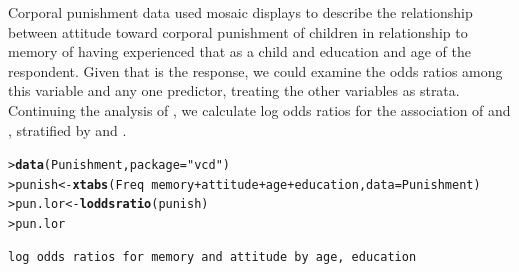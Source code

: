 \documentclass[10pt,krantz2]{krantz}\usepackage[]{graphicx}\usepackage[]{color}
\makeatletter
\newcommand{\hlstr}[1]{\textcolor[rgb]{0.192,0.494,0.8}{#1}}%
\newcommand{\hlopt}[1]{\textcolor[rgb]{0,0,0}{#1}}%
\newcommand{\hlstd}[1]{\textcolor[rgb]{0.345,0.345,0.345}{#1}}%
\newcommand{\hlkwb}[1]{\textcolor[rgb]{0.69,0.353,0.396}{#1}}%
\newcommand{\hlkwc}[1]{\textcolor[rgb]{0.333,0.667,0.333}{#1}}%
\newcommand{\hlkwd}[1]{\textcolor[rgb]{0.737,0.353,0.396}{\textbf{#1}}}%
\newenvironment{kframe}{%
 \def\at@end@of@kframe{}%
 \ifinner\ifhmode%
  \def\at@end@of@kframe{\end{minipage}}%
  \begin{minipage}{\columnwidth}%
 \fi\fi%
 \def\FrameCommand##1{\hskip\@totalleftmargin \hskip-\fboxsep
 \colorbox{shadecolor}{##1}\hskip-\fboxsep
     \hskip-\linewidth \hskip-\@totalleftmargin \hskip\columnwidth}%
 \MakeFramed {\advance\hsize-\width
   \@totalleftmargin\z@ \linewidth\hsize
   \@setminipage}}%
 {\par\unskip\endMakeFramed%
 \at@end@of@kframe}
\newenvironment{knitrout}{}{} %
\renewenvironment{knitrout}{\small\renewcommand{\baselinestretch}{.85}}{} %
\makeatother
\begin{document}
\begin{Example}[punish2]{Corporal punishment data}
 used mosaic displays to describe the relationship between attitude toward corporal punishment of children
in relationship to memory of having experienced that as a child and education and age of the respondent.
Given that  is the response, we could examine the odds ratios among this variable and any one predictor,
treating the other variables as strata.
Continuing the analysis of , we calculate log odds ratios for
the association of  and , stratified by  and .

\begin{knitrout}
\color{fgcolor}\begin{kframe}
\begin{alltt}
\hlstd{> }\hlkwd{data}\hlstd{(Punishment,} \hlkwc{package}\hlstd{=}\hlstr{"vcd"}\hlstd{)}
\hlstd{> }\hlstd{punish} \hlkwb{<-} \hlkwd{xtabs}\hlstd{(Freq} \hlopt{~} \hlstd{memory} \hlopt{+} \hlstd{attitude} \hlopt{+} \hlstd{age} \hlopt{+} \hlstd{education,} \hlkwc{data} \hlstd{= Punishment)}
\hlstd{> }\hlstd{pun.lor} \hlkwb{<-} \hlkwd{loddsratio}\hlstd{(punish)}
\hlstd{> }\hlstd{pun.lor}
\end{alltt}
\begin{verbatim}
log odds ratios for memory and attitude by age, education 


\end{verbatim}
\end{kframe}
\end{knitrout}
\end{Example}
\end{document}
